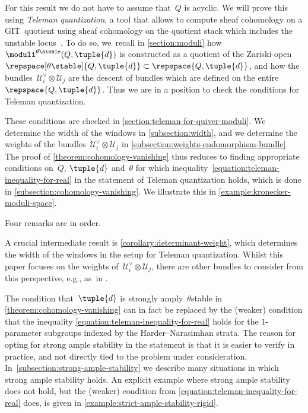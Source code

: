 For this result we do not have to assume that~$Q$ is acyclic.
We will prove this using \emph{Teleman quantization},
a tool that allows to compute sheaf cohomology on a GIT~quotient
using sheaf cohomology on the quotient stack which includes the unstable locus~\cite{MR1792291}.
To do so, we~recall in \cref{section:moduli}
how~$\moduli^{\theta\stable}(Q,\tuple{d})$ is constructed as a quotient
of the Zariski-open~$\repspace[\theta\stable]{Q,\tuple{d}}\subset\repspace{Q,\tuple{d}}$,
and how the bundles~$\mathcal{U}_i^\vee\otimes\mathcal{U}_j$ are the descent
of bundles which are defined on the entire~$\repspace{Q,\tuple{d}}$.
Thus we are in a position to check the conditions for Teleman quantization.

These conditions are checked in \cref{section:teleman-for-quiver-moduli}.
We determine the width of the windows in \cref{subsection:width},
and we determine the weights of the bundles~$\mathcal{U}_i^\vee\otimes\mathcal{U}_j$ in \cref{subsection:weights-endomorphism-bundle}.
The proof of \cref{theorem:cohomology-vanishing}
thus reduces to finding appropriate conditions on~$Q$, $\tuple{d}$ and~$\theta$
for which inequality~\eqref{equation:teleman-inequality-for-real} in the statement of Teleman quantization holds,
which is done in \cref{subsection:cohomology-vanishing}.
We illustrate this in \cref{example:kronecker-moduli-space}.

Four remarks are in order.

\begin{remark}
A crucial intermediate result is \cref{corollary:determinant-weight},
which determines the width of the windows in the setup for Teleman quantization.
Whilst this paper focuses on the weights of~$\mathcal{U}^\vee_i \otimes \mathcal{U}_j$,
there are other bundles to consider from this perspective,
e.g., as~in \cite{MR4894756}.
\end{remark}

\begin{remark}
\label{remark:strong-ample-stability}
The condition that~$\tuple{d}$ is strongly amply~$\theta$\dash stable
in \cref{theorem:cohomology-vanishing} can in fact be replaced by
the (weaker) condition
that the inequality \eqref{equation:teleman-inequality-for-real}
holds for the $1$-parameter subgroups indexed by the Harder--Narasimhan strata.
The reason for opting for strong ample stability in the statement
is that it is easier to verify in practice,
and not directly tied to the problem under consideration. In~\cref{subsection:strong-ample-stability} we describe many situations
in which strong ample stability holds.
An explicit example where strong ample stability does not hold,
but the (weaker) condition from \eqref{equation:teleman-inequality-for-real} does,
is given in \cref{example:strict-ample-stability-rigid}.
\end{remark}

